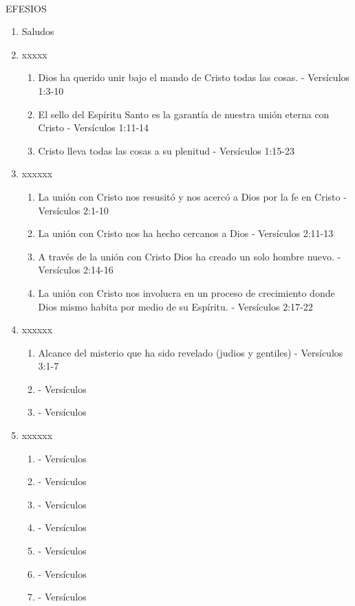 \documentclass[9pt,letterpaper]{article}
\author{Ciencias}
\begin{document}
	\\
	{\large EFESIOS}\\
	
	\begin{enumerate}
		\item Saludos
		\item  xxxxx
		\begin{enumerate}
			\item Dios ha querido unir bajo el mando de Cristo todas las cosas. - Versículos 1:3-10
			\item El sello del Espíritu Santo es la garantía de nuestra unión eterna con Cristo - Versículos 1:11-14
			\item Cristo lleva todas las cosas a su plenitud - Versículos 1:15-23
		\end{enumerate}
		\item xxxxxx
		\begin{enumerate}
			\item La unión con Cristo nos resusitó y nos acercó a Dios por la fe en Cristo - Versículos 2:1-10
			\item La unión con Cristo nos ha hecho cercanos a Dios - Versículos 2:11-13
			\item A través de la unión con Cristo Dios ha creado un solo hombre nuevo. - Versículos 2:14-16
			\item La unión con Cristo nos involucra en un proceso de crecimiento donde Dios mismo habita por medio de su Espíritu. - Versículos 2:17-22
		\end{enumerate}
		\item xxxxxx
		\begin{enumerate}
			\item Alcance del misterio que ha sido revelado (judios y gentiles) - Versículos 3:1-7
			\item  - Versículos 
			\item  - Versículos 
		\end{enumerate}
		\item xxxxxx
		\begin{enumerate}
			\item  - Versículos 
			\item  - Versículos 
			\item  - Versículos 
			\item  - Versículos 
			\item  - Versículos 
			\item  - Versículos 
			\item  - Versículos 

\end{enumerate}
\end{enumerate}
\end{document}
